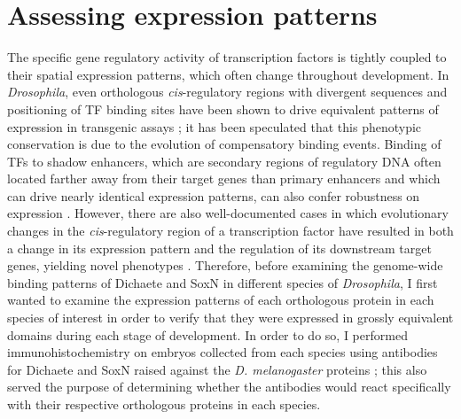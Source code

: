 \section{Assessing expression patterns}
The specific gene regulatory activity of transcription factors is tightly coupled to their spatial expression patterns, which often change throughout development. In \emph{Drosophila}, even orthologous \emph{cis}-regulatory regions with divergent sequences and positioning of TF binding sites have been shown to drive equivalent patterns of expression in transgenic assays \citep{hare_sepsid_2008}; it has been speculated that this phenotypic conservation is due to the evolution of compensatory binding events. Binding of TFs to shadow enhancers, which are secondary regions of regulatory DNA often located farther away from their target genes than primary enhancers and which can drive nearly identical expression patterns, can also confer robustness on expression \citep{ludwig_consequences_2011,perry_shadow_2010}. However, there are also well-documented cases in which evolutionary changes in the \emph{cis}-regulatory region of a transcription factor have resulted in both a change in its expression pattern and the regulation of its downstream target genes, yielding novel phenotypes \citep{arnoult_emergence_2013,frankel_conserved_2012}. Therefore, before examining the genome-wide binding patterns of Dichaete and SoxN in different species of \emph{Drosophila}, I first wanted to examine the expression patterns of each orthologous protein in each species of interest in order to verify that they were expressed in grossly equivalent domains during each stage of development. In order to do so, I performed immunohistochemistry on embryos collected from each species using antibodies for Dichaete and SoxN raised against the \emph{D. melanogaster} proteins \citep{ferrero_soxneuro_2014,soriano_drosophila_1998}; this also served the purpose of determining whether the antibodies would react specifically with their respective orthologous proteins in each species.

